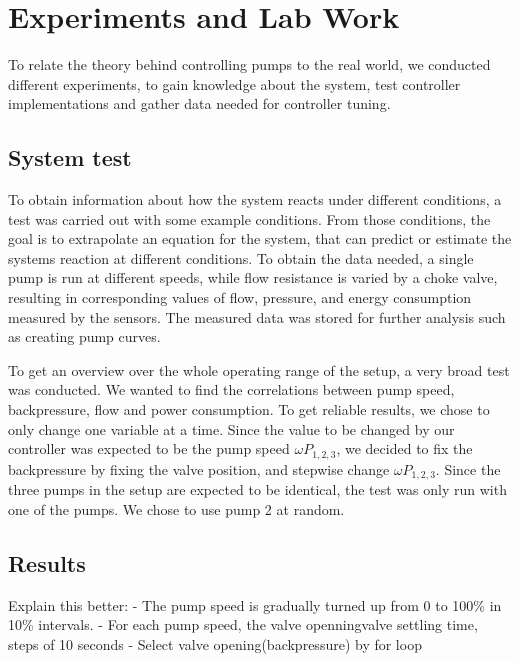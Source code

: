 \chapter{Experiments and Lab Work}\label{ch:experiment}
To relate the theory behind controlling pumps to the real world,
we conducted different experiments,
to gain knowledge about the system,
test controller implementations and gather data needed for controller tuning.

\section{System test}\label{sec:system_test} 
To obtain information about how the system reacts under different conditions,
a test was carried out with some example conditions.
From those conditions, the goal is to extrapolate an equation for the system,
that can predict or estimate  the systems reaction at different conditions.
To obtain the data needed,
a single pump is run at different speeds,
while flow resistance is varied by a choke valve,
resulting in corresponding values of flow, pressure, and energy consumption
measured by the sensors.
The measured data was stored for further analysis such as creating pump curves.

To get an overview over the whole operating range of the setup,
a very broad test was conducted.
We wanted to find the correlations between pump speed, backpressure, flow and power consumption.
To get reliable results, we chose to only change one variable at a time.
Since the value to be changed by our controller was expected to be the pump speed $\omega P_{1,2,3}$,
we decided to fix the backpressure by fixing the valve position,
and stepwise change $\omega P_{1,2,3}$.
Since the three pumps in the setup are expected to be identical,
the test was only run with one of the pumps.
We chose to use pump 2 at random.



\section{Results}\label{sec:results}
Explain this better:\newline
- The pump speed is gradually turned up from 0 to 100\% in 10\% intervals. \newline
- For each pump speed, the valve openningvalve settling time, steps of 10 seconds\newline
- Select valve opening(backpressure) by for loop\newline

